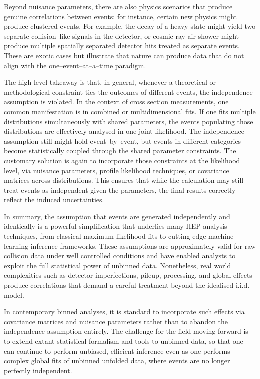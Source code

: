         Beyond nuisance parameters, there are also physics scenarios that produce genuine correlations between events: for instance, certain new physics might produce clustered events.
        For example, the decay of a heavy state might yield two separate collision--like signals in the detector, or cosmic ray air shower might produce multiple spatially separated detector hits treated as separate events.
        These are exotic cases but illustrate that nature can produce data that do not align with the one--event--at--a--time paradigm.
        
        The high level takeaway is that, in general, whenever a theoretical or methodological constraint ties the outcomes of different events, the independence assumption is violated.
        In the context of cross section measurements, one common manifestation is in combined or multidimensional fits.
        If one fits multiple distributions simultaneously with shared parameters, the events populating those distributions are effectively analysed in one joint likelihood.
        The independence assumption still might hold event--by--event, but events in different categories become statistically coupled through the shared parameter constraints.
        The customary solution is again to incorporate those constraints at the likelihood level, via nuisance parameters, profile likelihood techniques, or covariance matrices across distributions.
        This ensures that while the calculation may still treat events as independent given the parameters, the final results correctly reflect the induced uncertainties.

    In summary, the assumption that events are generated independently and identically is a powerful simplification that underlies many HEP analysis techniques, from classical maximum likelihood fits to cutting edge machine learning inference frameworks.
    These assumptions are approximately valid for raw collision data under well controlled conditions and have enabled analysts to exploit the full statistical power of unbinned data.
    Nonetheless, real world complexities such as detector imperfections, pileup, processing, and global effects produce correlations that demand a careful treatment beyond the idealised i.i.d. model.
    
    In contemporary binned analyses, it is standard to incorporate such effects via covariance matrices and nuisance parameters rather than to abandon the independence assumption entirely.
    The challenge for the field moving forward is to extend extant statistical formalism and tools to unbinned data, so that one can continue to perform unbiased, efficient inference even as one performs complex global fits of unbinned unfolded data, where events are no longer perfectly independent.
    
